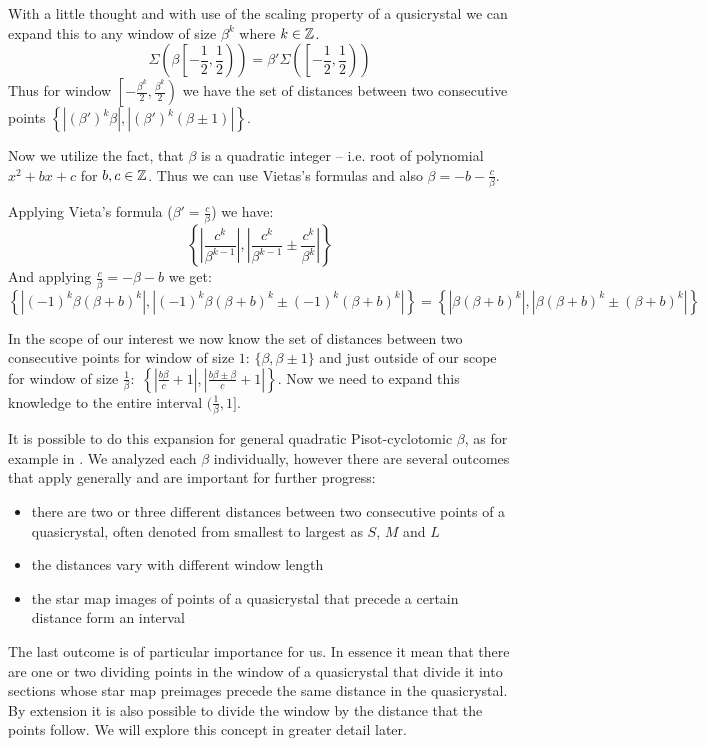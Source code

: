 \documentclass[text.tex]{subfiles}
\begin{document}
With a little thought and with use of the scaling property of a qusicrystal we can expand this to any window of size $\beta^k$ where $k\in\mathbb{Z}$. 
$$\Sigma\left(\beta\left[-\frac{1}{2}, \frac{1}{2}\right)\right) = \beta'\Sigma\left(\left[-\frac{1}{2}, \frac{1}{2}\right)\right)$$%
Thus for window $\left[-\frac{\beta^k}{2}, \frac{\beta^k}{2}\right)$ we have the set of distances between two consecutive points $\left\{\left|(\beta')^k\beta\right|, \left|(\beta')^k(\beta \pm 1)\right|\right\}$. %

Now we utilize the fact, that $\beta$ is a quadratic integer -- i.e. root of polynomial $x^2+bx+c$ for $b,c\in\mathbb{Z}$. Thus we can use Vietas's formulas and also $\beta = -b-\frac{c}{\beta}$. 

Applying Vieta's formula ($\beta' = \frac{c}{\beta}$) we have:
$$\left\{\left|\frac{c^k}{\beta^{k-1}}\right|, \left|\frac{c^k}{\beta^{k-1}}\pm\frac{c^k}{\beta^{k}}\right|\right\}$$
And applying $\frac{c}{\beta}=-\beta-b$ we get:
$$\left\{\left|(-1)^k\beta(\beta+b)^k\right|, \left|(-1)^k\beta(\beta+b)^k\pm(-1)^k(\beta+b)^k\right|\right\} = \left\{\left|\beta(\beta+b)^k\right|, \left|\beta(\beta+b)^k\pm(\beta+b)^k\right|\right\}$$

In the scope of our interest we now know the set of distances between two consecutive points for window of size $1$: $\{\beta, \beta \pm 1\}$ and just outside of our scope for window of size $\frac{1}{\beta}$:~$\left\{\left|\frac{b\beta}{c}+1\right|, \left|\frac{b\beta\pm\beta}{c} + 1\right|\right\}$. Now we need to expand this knowledge to the entire interval $(\frac{1}{\beta},1]$. %

It is possible to do this expansion for general quadratic Pisot-cyclotomic $\beta$, as for example in \cite{distances}. We analyzed each $\beta$ individually, however there are several outcomes that apply generally and are important for further progress: 
\begin{itemize}
\item there are two or three different distances between two consecutive points of a quasicrystal, often denoted from smallest to largest as $S$, $M$ and $L$
\item the distances vary with different window length
\item the star map images of points of a quasicrystal that precede a certain distance form an interval
\end{itemize}

The last outcome is of particular importance for us. In essence it mean that there are one or two dividing points in the window of a quasicrystal that divide it into sections whose star map preimages precede the same distance in the quasicrystal. By extension it is also possible to divide the window by the distance that the points follow. We will explore this concept in greater detail later. 
\end{document}
